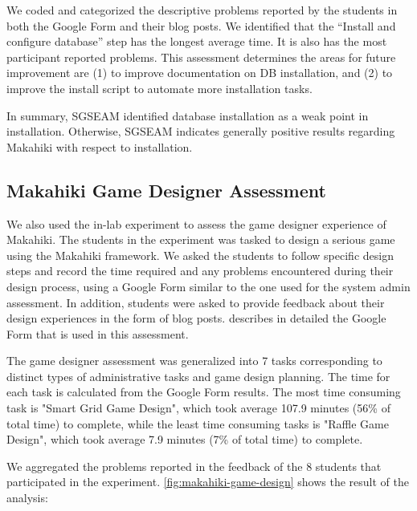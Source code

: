 \documentclass{sigchi}
\begin{document}
We coded and categorized the descriptive problems reported by the students in both the Google Form
and their blog posts. We identified that the ``Install and configure database'' step has the
longest average time. It is also has the most participant reported problems. This assessment determines the areas for future
improvement are (1) to improve documentation on DB installation, and (2) to improve the install script to automate
more installation tasks.

In summary, SGSEAM identified database installation as a weak point in
installation.  Otherwise, SGSEAM indicates generally positive results regarding
Makahiki with respect to installation. 

\subsection{Makahiki Game Designer Assessment}

We also used the in-lab experiment to assess the game
designer experience of Makahiki. The students in the
experiment was tasked to design a serious game using the Makahiki framework. We asked the students
to follow specific design steps and record the time required and any problems encountered during
their design process, using a Google Form similar to the one used for the system admin
assessment. In addition, students were asked to provide feedback about their
design experiences in the form of blog posts. \cite{csdl2-13-04} describes in detailed
the Google Form that is used in this assessment.

The game designer assessment was generalized into 7 tasks corresponding to
distinct types of administrative tasks and game design planning. The time for each task is
calculated from the Google Form results.  The most time consuming task
 is "Smart Grid Game Design", which took average 107.9 minutes (56\% of total time) to complete,
 while the least time
  consuming tasks is "Raffle Game Design", which took average 7.9 minutes (7\% of total time)
  to complete.

 We aggregated the problems reported in the feedback of the 8 students that participated in the experiment.
\autoref{fig:makahiki-game-design} shows the result of the analysis:
\end{document}
